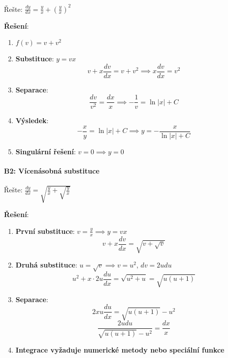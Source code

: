 \begin{example}
Řešte: $\frac{dy}{dx} = \frac{y}{x} + \left(\frac{y}{x}\right)^2$
\vspace{0.3\baselineskip}

\textbf{Řešení}: 
\begin{enumerate}
\item $f(v) = v + v^2$

\item \textbf{Substituce}: $y = vx$
\[
v + x\frac{dv}{dx} = v + v^2 \implies x\frac{dv}{dx} = v^2
\]

\item \textbf{Separace}:
\[
\frac{dv}{v^2} = \frac{dx}{x} \implies -\frac{1}{v} = \ln|x| + C
\]

\item \textbf{Výsledek}:
\[
-\frac{x}{y} = \ln|x| + C \implies y = -\frac{x}{\ln|x| + C}
\]

\item \textbf{Singulární řešení}: $v = 0 \implies y = 0$
\end{enumerate}
\end{example}

\vspace{0.8\baselineskip}

\paragraph*{B2: Vícenásobná substituce}

\begin{example}
Řešte: $\frac{dy}{dx} = \sqrt{\frac{y}{x} + \sqrt{\frac{y}{x}}}$
\vspace{0.3\baselineskip}

\textbf{Řešení}: 
\begin{enumerate}
\item \textbf{První substituce}: $v = \frac{y}{x} \implies y = vx$
\[
v + x\frac{dv}{dx} = \sqrt{v + \sqrt{v}}
\]

\item \textbf{Druhá substituce}: $u = \sqrt{v} \implies v = u^2$, $dv = 2u  du$
\[
u^2 + x\cdot 2u\frac{du}{dx} = \sqrt{u^2 + u} = \sqrt{u(u + 1)}
\]

\item \textbf{Separace}:
\[
2xu\frac{du}{dx} = \sqrt{u(u + 1)} - u^2
\]
\[
\frac{2u  du}{\sqrt{u(u + 1)} - u^2} = \frac{dx}{x}
\]

\item \textbf{Integrace vyžaduje numerické metody nebo speciální funkce}
\end{enumerate}
\end{example}

